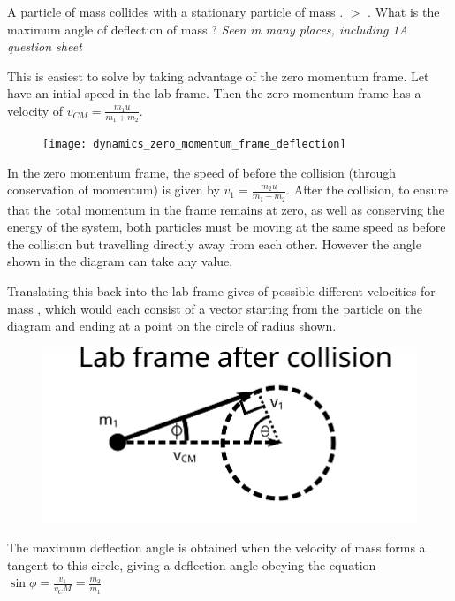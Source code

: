 
\begin{problem}   %
{A particle of mass  collides with a stationary particle of mass .  $>$ . What is the maximum angle of deflection of mass ?} %
{\textit{Seen in many places, including 1A question sheet}} %
{This is easiest to solve by taking advantage of the zero momentum frame. Let  have an intial speed  in the lab frame. Then the zero momentum frame has a velocity of $v_{CM} = \frac{m_{1}u}{m_{1} + m_{2}}$.

\begin{figure}[h]
\centering
\texttt{[image: dynamics\_zero\_momentum\_frame\_deflection]}
\caption{}
\label{fig:dynamics_zero_momentum_frame_deflection}
\end{figure}


In the zero momentum frame, the speed of  before the collision (through conservation of momentum) is given by $v_1 = \frac{m_{2}u}{m_{1} + m_{2}}$. After the collision, to ensure that the total momentum in the frame remains at zero, as well as conserving the energy of the system, both particles must be moving at the same speed as before the collision but travelling directly away from each other. However the angle \vari{\theta} shown in the diagram can take any value.


Translating this back into the lab frame gives of possible different velocities for mass  , which would each consist of a vector starting from the particle on the diagram and ending at a point on the circle of radius  shown.

\begin{figure}[h]
\centering
\includegraphics[scale =1]{../../../figures/dynamics_lab_frame_deflection.svg}
\caption{}
\label{fig:dynamics_lab_frame_deflection}
\end{figure}

 The maximum deflection angle is obtained when the velocity of mass  forms a tangent to this circle, giving a deflection angle \vari{\phi} obeying the equation $\sin{\phi} =  \frac{v_1}{v_CM} = \frac{m_2}{m_1}$ }%
\end{problem}

